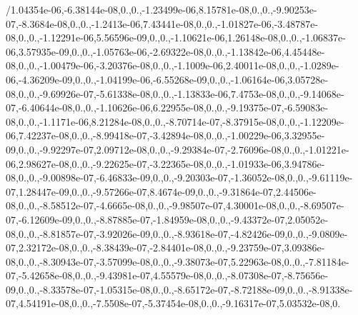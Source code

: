 {/1.\-04354e-\/06,-\/6.\-38144e-\/08,0.,0.,-\/1.\-23499e-\/06,8.\-15781e-\/08,0.,0.,-\/9.\-90253e-\/07,-\/8.\-3684e-\/08,0.,0.,-\/1.\-2413e-\/06,7.\-43441e-\/08,0.,0.,-\/1.\-01827e-\/06,-\/3.\-48787e-\/08,0.,0.,-\/1.\-12291e-\/06,5.\-56596e-\/09,0.,0.,-\/1.\-10621e-\/06,1.\-26148e-\/08,0.,0.,-\/1.\-06837e-\/06,3.\-57935e-\/09,0.,0.,-\/1.\-05763e-\/06,-\/2.\-69322e-\/08,0.,0.,-\/1.\-13842e-\/06,4.\-45448e-\/08,0.,0.,-\/1.\-00479e-\/06,-\/3.\-20376e-\/08,0.,0.,-\/1.\-1009e-\/06,2.\-40011e-\/08,0.,0.,-\/1.\-0289e-\/06,-\/4.\-36209e-\/09,0.,0.,-\/1.\-04199e-\/06,-\/6.\-55268e-\/09,0.,0.,-\/1.\-06164e-\/06,3.\-05728e-\/08,0.,0.,-\/9.\-69926e-\/07,-\/5.\-61338e-\/08,0.,0.,-\/1.\-13833e-\/06,7.\-4753e-\/08,0.,0.,-\/9.\-14068e-\/07,-\/6.\-40644e-\/08,0.,0.,-\/1.\-10626e-\/06,6.\-22955e-\/08,0.,0.,-\/9.\-19375e-\/07,-\/6.\-59083e-\/08,0.,0.,-\/1.\-1171e-\/06,8.\-21284e-\/08,0.,0.,-\/8.\-70714e-\/07,-\/8.\-37915e-\/08,0.,0.,-\/1.\-12209e-\/06,7.\-42237e-\/08,0.,0.,-\/8.\-99418e-\/07,-\/3.\-42894e-\/08,0.,0.,-\/1.\-00229e-\/06,3.\-32955e-\/09,0.,0.,-\/9.\-92297e-\/07,2.\-09712e-\/08,0.,0.,-\/9.\-29384e-\/07,-\/2.\-76096e-\/08,0.,0.,-\/1.\-01221e-\/06,2.\-98627e-\/08,0.,0.,-\/9.\-22625e-\/07,-\/3.\-22365e-\/08,0.,0.,-\/1.\-01933e-\/06,3.\-94786e-\/08,0.,0.,-\/9.\-00898e-\/07,-\/6.\-46833e-\/09,0.,0.,-\/9.\-20303e-\/07,-\/1.\-36052e-\/08,0.,0.,-\/9.\-61119e-\/07,1.\-28447e-\/09,0.,0.,-\/9.\-57266e-\/07,8.\-4674e-\/09,0.,0.,-\/9.\-31864e-\/07,2.\-44506e-\/08,0.,0.,-\/8.\-58512e-\/07,-\/4.\-6665e-\/08,0.,0.,-\/9.\-98507e-\/07,4.\-30001e-\/08,0.,0.,-\/8.\-69507e-\/07,-\/6.\-12609e-\/09,0.,0.,-\/8.\-87885e-\/07,-\/1.\-84959e-\/08,0.,0.,-\/9.\-43372e-\/07,2.\-05052e-\/08,0.,0.,-\/8.\-81857e-\/07,-\/3.\-92026e-\/09,0.,0.,-\/8.\-93618e-\/07,-\/4.\-82426e-\/09,0.,0.,-\/9.\-0809e-\/07,2.\-32172e-\/08,0.,0.,-\/8.\-38439e-\/07,-\/2.\-84401e-\/08,0.,0.,-\/9.\-23759e-\/07,3.\-09386e-\/08,0.,0.,-\/8.\-30943e-\/07,-\/3.\-57099e-\/08,0.,0.,-\/9.\-38073e-\/07,5.\-22963e-\/08,0.,0.,-\/7.\-81184e-\/07,-\/5.\-42658e-\/08,0.,0.,-\/9.\-43981e-\/07,4.\-55579e-\/08,0.,0.,-\/8.\-07308e-\/07,-\/8.\-75656e-\/09,0.,0.,-\/8.\-33578e-\/07,-\/1.\-05315e-\/08,0.,0.,-\/8.\-65172e-\/07,-\/8.\-72188e-\/09,0.,0.,-\/8.\-91338e-\/07,4.\-54191e-\/08,0.,0.,-\/7.\-5508e-\/07,-\/5.\-37454e-\/08,0.,0.,-\/9.\-16317e-\/07,5.\-03532e-\/08,0.\-}
